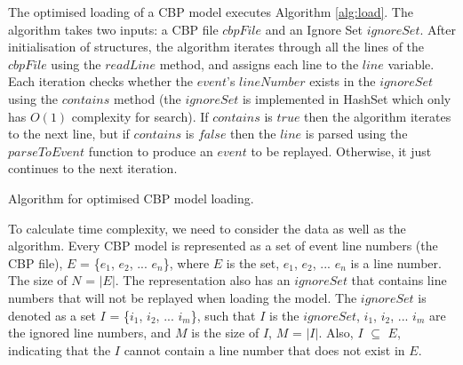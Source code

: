 \documentclass{llncs}
\begin{document}
    The optimised loading of a CBP model executes Algorithm \ref{alg:load}.  The algorithm takes two inputs: a CBP file $cbpFile$ and an Ignore Set $ignoreSet$. After initialisation of structures, the algorithm iterates through all the lines of the $cbpFile$ using the $readLine$ method, and assigns each line to the $line$ variable. Each iteration checks whether the $event$'s $lineNumber$ exists in the $ignoreSet$ using the $contains$ method (the $ignoreSet$ is implemented in HashSet which only has $O(1)$ complexity for search).  If $contains$ is  $true$ then the algorithm iterates to the next line, but if $contains$ is  $false$ then the $line$ is parsed using the $parseToEvent$ function to produce an $event$ to be replayed. Otherwise, it just continues to the next iteration. 
    
    
    \begin{algorithm}[H]
        \begin{small}
        \end{small}
        \caption{Algorithm for optimised CBP model loading.}
        \label{alg:load}
    \end{algorithm}
    
    To calculate time complexity, we need to consider the data as well as the algorithm.  Every CBP model is represented as a set of event line numbers (the CBP file), $E$ = \{$e_1$, $e_2$, ... $e_n$\}, where $E$ is the set, $e_1$, $e_2$, ... $e_n$ is a line number.  The size of $N$ = $|E|$. The representation also has an $ignoreSet$ that contains line numbers that will not be replayed when loading the model. The $ignoreSet$ is denoted as a set $I$  = \{$i_1$, $i_2$, ... $i_m$\}, such that $I$ is the $ignoreSet$, $i_1$, $i_2$, ... $i_m$ are the ignored line numbers, and $M$ is the size of $I$, $M$ = $|I|$. Also, $I$ $\subseteq$ $E$, indicating that the $I$ cannot contain a line number that does not exist in $E$.
    
\end{document}
